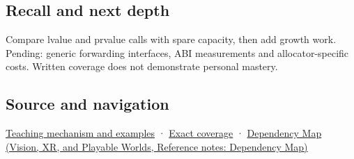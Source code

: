 \subsection{Recall and next depth}\label{appendix-d5908f75721f-recall-and-next-depth}

Compare lvalue and prvalue calls with spare capacity, then add growth work. Pending: generic forwarding interfaces, ABI measurements and allocator-specific costs. Written coverage does not demonstrate personal mastery.

\subsection{Source and navigation}\label{appendix-d5908f75721f-source-and-navigation}

\hyperref[01-foundations-i-ch003-a-value-crosses-the-function-boundary]{Teaching mechanism and examples} · \hyperref[appendix-fd090d982a15-m009---parts-127-147]{Exact coverage} · \href{../07-Vision-XR-and-Playable-Worlds/main.pdf\#nameddest=appendix-4ad47bdd269a}{Dependency Map (Vision, XR, and Playable Worlds, Reference notes: Dependency Map)}
